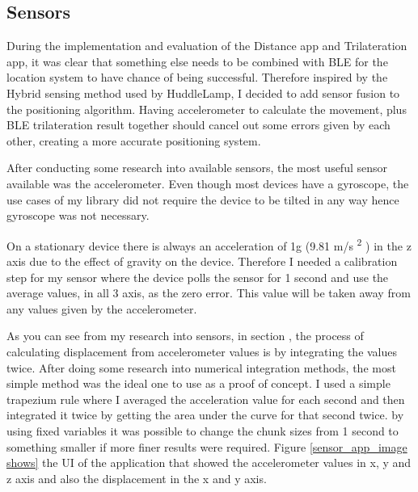 \subsection{Sensors} \label{nocamera_sensors}
During the implementation and evaluation of the Distance app and Trilateration app, it was clear that something else needs to be combined with BLE for the location system to have chance of being successful. Therefore inspired by the Hybrid sensing method used by HuddleLamp, I decided to add sensor fusion to the positioning algorithm. Having accelerometer to calculate the movement, plus BLE trilateration result together should cancel out some errors given by each other, creating a more accurate positioning system.

After conducting some research into available sensors, the most useful sensor available was the accelerometer. Even though most devices have a gyroscope, the use cases of my library did not require the device to be tilted in any way hence gyroscope was not necessary. 

On a stationary device there is always an acceleration of 1g (9.81 m/s \textsuperscript{2} )
in the z axis due to the effect of gravity on the device. Therefore I needed a calibration step for my sensor where the device polls the sensor for 1 second and use the average values, in all 3 axis, as the zero error. This value will be taken away from any values given by the accelerometer.

As you can see from my research into sensors, in section , the process of calculating displacement from accelerometer values is by integrating the values twice. After doing some research into numerical integration methods, the most simple method was the ideal one to use as a proof of concept. I used a simple trapezium rule where I averaged the acceleration value for each second and then integrated it twice by getting the area under the curve for that second twice. by using fixed variables it was possible to change the chunk sizes from 1 second to something smaller if more finer results were required.
Figure \ref{sensor_app_image shows} the UI of the application that showed the accelerometer values in x, y and z axis and also the displacement in the x and y axis.

